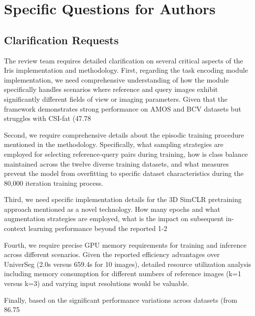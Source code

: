 \section*{Specific Questions for Authors}
\label{sec:questions_authors}

\subsection*{Clarification Requests}
The review team requires detailed clarification on several critical aspects of the Iris implementation and methodology. First, regarding the task encoding module implementation, we need comprehensive understanding of how the module specifically handles scenarios where reference and query images exhibit significantly different fields of view or imaging parameters. Given that the framework demonstrates strong performance on AMOS and BCV datasets but struggles with CSI-fat (47.78%

Second, we require comprehensive details about the episodic training procedure mentioned in the methodology. Specifically, what sampling strategies are employed for selecting reference-query pairs during training, how is class balance maintained across the twelve diverse training datasets, and what measures prevent the model from overfitting to specific dataset characteristics during the 80,000 iteration training process.

Third, we need specific implementation details for the 3D SimCLR pretraining approach mentioned as a novel technology. How many epochs and what augmentation strategies are employed, what is the impact on subsequent in-context learning performance beyond the reported 1-2%

Fourth, we require precise GPU memory requirements for training and inference across different scenarios. Given the reported efficiency advantages over UniverSeg (2.0s versus 659.4s for 10 images), detailed resource utilization analysis including memory consumption for different numbers of reference images (k=1 versus k=3) and varying input resolutions would be valuable.

Finally, based on the significant performance variations across datasets (from 86.75%

